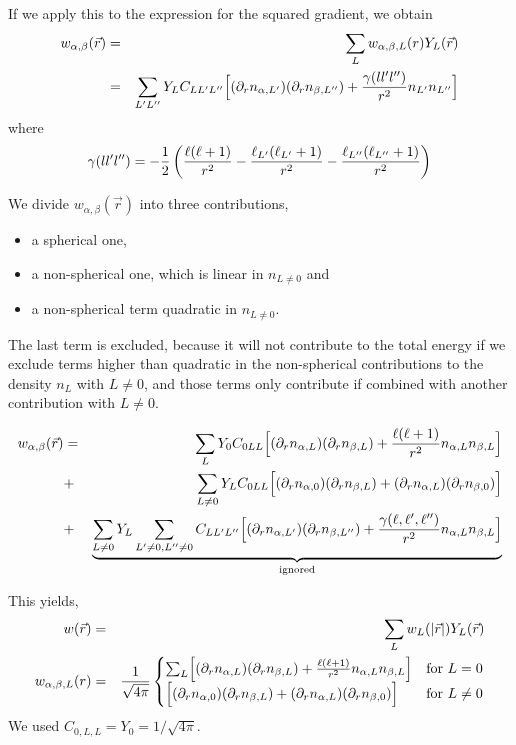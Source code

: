 \documentclass[11pt,a4paper]{report}
\begin{document}
If we apply this to the expression for the squared gradient, we obtain
\begin{eqnarray}
w_{\alpha,\beta}(\vec{r})&=&\sum_L w_{\alpha,\beta,L}(r) Y_L(\vec{r})
\nonumber\\
&=&\sum_{L^\prime L^{\prime\prime}}
Y_L C_{LL^\prime L^{\prime\prime}}
\Bigl[
(\partial_r n_{\alpha,L^\prime})(\partial_r n_{\beta,L^{\prime\prime}})
+{{\gamma(ll^{\prime}l^{\prime\prime})}\over{r^2}}
n_{L^\prime}n_{L^{\prime\prime}}
\Bigr]
\end{eqnarray}
where 
\begin{equation}
\gamma(ll^{\prime}l^{\prime\prime})=-
\frac{1}{2} 
\left({{\ell(\ell+1)}\over{r^2}}-{{\ell_{L^\prime}(\ell_{L^\prime}+1)}\over{r^2}}
-{{\ell_{L^{\prime\prime}}(\ell_{L^{\prime\prime}}+1)}\over{r^2}}\right)
\end{equation}

We divide $w_{\alpha,\beta}(\vec{r})$ into three contributions, 
\begin{itemize}
\item a spherical one, 
\item a non-spherical one, which is linear in $n_{L{\neq}0}$ and 
\item a non-spherical term
quadratic in $n_{L{\neq}0}$. 
\end{itemize}
The last term is excluded, because it
will not contribute to the total energy if we exclude terms higher
than quadratic in the non-spherical contributions to the density
$n_L$ with $L\neq0$, and those terms only contribute if combined
with another contribution with $L\neq 0$.

\begin{eqnarray}
w_{\alpha,\beta}(\vec{r})&=&\sum_{L}Y_0 C_{0LL}
\Bigl[(\partial_r n_{\alpha,L})(\partial_r n_{\beta,L})
+\frac{\ell(\ell+1)}{r^2}n_{\alpha,L}n_{\beta,L}
\Bigr]
\nonumber\\
&+&\sum_{L\neq0}Y_L C_{0LL}\Bigl[
(\partial_r n_{\alpha,0})(\partial_r n_{\beta,L}) 
+(\partial_r n_{\alpha,L})(\partial_r n_{\beta,0}) 
\Bigr]
\nonumber\\
&+&
\underbrace{\sum_{L\neq0}Y_L 
\sum_{L'\neq0,L''\neq0}
C_{LL'L''}\Bigl[
(\partial_r n_{\alpha,L'})(\partial_r n_{\beta,L''}) 
+\frac{\gamma(\ell,\ell',\ell'')}{r^2}n_{\alpha,L}n_{\beta,L}
\Bigr]}_{\text{ignored}}
\end{eqnarray}


This yields,
\begin{eqnarray}
w(\vec{r})&=&\sum_L w_{L}(|\vec{r}|)Y_{L}(\vec{r})
\\
w_{\alpha,\beta,L}(r)&=&\frac{1}{\sqrt{4\pi}}
\begin{cases}
\sum_{L}
\Bigl[(\partial_r n_{\alpha,L})(\partial_r n_{\beta,L})
+\frac{\ell(\ell+1)}{r^2}n_{\alpha,L}n_{\beta,L}
\Bigr]&\text{for $L=0$}\\
\Bigl[
(\partial_r n_{\alpha,0})(\partial_r n_{\beta,L}) 
+(\partial_r n_{\alpha,L})(\partial_r n_{\beta,0}) 
\Bigr]
&\text{for $L\neq0$}
\end{cases}
\end{eqnarray}
We used $C_{0,L,L}=Y_0=1/\sqrt{4\pi}$.
\end{document}
